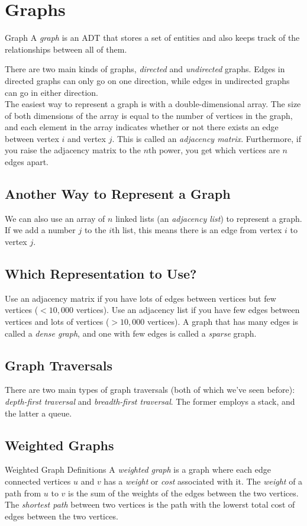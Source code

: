 \documentclass[class=article, crop=false]{standalone}
\begin{document}
  \section{Graphs}
  \begin{definition}{Graph}
    A \emph{graph} is an ADT that stores a set of entities and also keeps track of the relationships between all of them.
  \end{definition}
  There are two main kinds of graphs, \emph{directed} and \emph{undirected} graphs. Edges in directed graphs can only go on one direction, while edges in undirected graphs can go in either direction. \\[10pt]
  The easiest way to represent a graph is with a double-dimensional array. The size of both dimensions of the array is equal to the number of vertices in the graph, and each element in the array indicates whether or not there exists an edge between vertex $i$ and vertex $j$. This is called an \emph{adjacency matrix}. Furthermore, if you raise the adjacency matrix to the $n$th power, you get which vertices are $n$ edges apart.
  \subsection{Another Way to Represent a Graph}
  We can also use an array of $n$ linked lists (an \emph{adjacency list}) to represent a graph. If we add a number $j$ to the $i$th list, this means there is an edge from vertex $i$ to vertex $j$.
  \subsection{Which Representation to Use?}
  Use an adjacency matrix if you have lots of edges between vertices but few vertices ($<10,000$ vertices). Use an adjacency list if you have few edges between vertices and lots of vertices ($>10,000$ vertices). A graph that has many edges is called a \emph{dense graph}, and one with few edges is called a \emph{sparse} graph.
  \subsection{Graph Traversals}
  There are two main types of graph traversals (both of which we've seen before): \emph{depth-first traversal} and \emph{breadth-first traversal}. The former employs a stack, and the latter a queue. 
  \subsection{Weighted Graphs}
  \begin{definition}{Weighted Graph Definitions}
    A \emph{weighted graph} is a graph where each edge connected vertices $u$ and $v$ has a \emph{weight} or \emph{cost} associated with it. The \emph{weight} of a path from $u$ to $v$ is the sum of the weights of the edges between the two vertices. The \emph{shortest path} between two vertices is the path with the lowerst total cost of edges between the two vertices.
  \end{definition}
\end{document}
